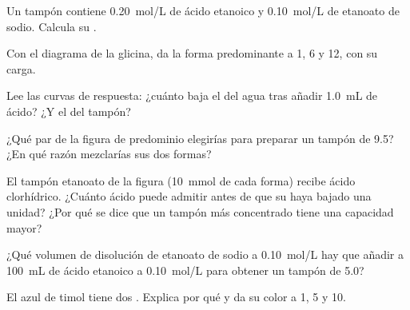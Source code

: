 \begin{exercise}[$\star\star$]\label{exo:g12:buffers-predominance:8}
Un tampón contiene \qty{0.20}{mol/L} de ácido etanoico y
\qty{0.10}{mol/L} de etanoato de sodio. Calcula su .
\end{exercise}

\begin{exercise}[$\star\star$]\label{exo:g12:buffers-predominance:9}
Con el diagrama de la glicina, da la forma predominante a  1, 6 y 12,
con su carga.
\end{exercise}

\begin{exercise}[$\star\star$]\label{exo:g12:buffers-predominance:10}
Lee las curvas de respuesta: ¿cuánto baja el  del agua tras añadir
\qty{1.0}{mL} de ácido? ¿Y el del tampón?
\end{exercise}

\begin{exercise}[$\star\star$]\label{exo:g12:buffers-predominance:11}
¿Qué par de la figura de predominio elegirías para preparar un tampón de
 9.5? ¿En qué razón mezclarías sus dos formas?
\end{exercise}

\begin{exercise}[$\star\star\star$]\label{exo:g12:buffers-predominance:12}
El tampón etanoato de la figura (\qty{10}{mmol} de cada forma) recibe
ácido clorhídrico. ¿Cuánto ácido puede admitir antes de que su  haya
bajado una unidad? ¿Por qué se dice que un tampón más concentrado tiene
una capacidad mayor?
\end{exercise}

\begin{exercise}[$\star\star\star$]\label{exo:g12:buffers-predominance:13}
¿Qué volumen de disolución de etanoato de sodio a \qty{0.10}{mol/L} hay
que añadir a \qty{100}{mL} de ácido etanoico a \qty{0.10}{mol/L} para
obtener un tampón de  5.0?
\end{exercise}

\begin{exercise}[$\star\star\star$]\label{exo:g12:buffers-predominance:14}
El azul de timol tiene dos . Explica por qué y da su color
a  1, 5 y 10.
\end{exercise}

